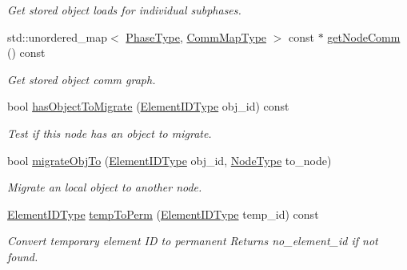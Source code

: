 \begin{DoxyCompactItemize}
\begin{DoxyCompactList}\small\item\em Get stored object loads for individual subphases. \end{DoxyCompactList}\item 
std\+::unordered\+\_\+map$<$ \hyperlink{namespacevt_a46ce6733d5cdbd735d561b7b4029f6d7}{Phase\+Type}, \hyperlink{namespacevt_1_1vrt_1_1collection_1_1balance_a10860c956804d644db54a16012352728}{Comm\+Map\+Type} $>$ const  $\ast$ \hyperlink{structvt_1_1vrt_1_1collection_1_1balance_1_1_node_stats_a236c9f6b9ba7446a35cbc1052949d558}{get\+Node\+Comm} () const
\begin{DoxyCompactList}\small\item\em Get stored object comm graph. \end{DoxyCompactList}\item 
bool \hyperlink{structvt_1_1vrt_1_1collection_1_1balance_1_1_node_stats_a06128ad9d9dff72bad160b015054b054}{has\+Object\+To\+Migrate} (\hyperlink{namespacevt_1_1vrt_1_1collection_1_1balance_a14c8d2c972f2913aa3f1636e5be0a120}{Element\+I\+D\+Type} obj\+\_\+id) const
\begin{DoxyCompactList}\small\item\em Test if this node has an object to migrate. \end{DoxyCompactList}\item 
bool \hyperlink{structvt_1_1vrt_1_1collection_1_1balance_1_1_node_stats_a4beddbda7ae149a3470eba3a2fe80db5}{migrate\+Obj\+To} (\hyperlink{namespacevt_1_1vrt_1_1collection_1_1balance_a14c8d2c972f2913aa3f1636e5be0a120}{Element\+I\+D\+Type} obj\+\_\+id, \hyperlink{namespacevt_a866da9d0efc19c0a1ce79e9e492f47e2}{Node\+Type} to\+\_\+node)
\begin{DoxyCompactList}\small\item\em Migrate an local object to another node. \end{DoxyCompactList}\item 
\hyperlink{namespacevt_1_1vrt_1_1collection_1_1balance_a14c8d2c972f2913aa3f1636e5be0a120}{Element\+I\+D\+Type} \hyperlink{structvt_1_1vrt_1_1collection_1_1balance_1_1_node_stats_a259d49b9aa4759b9d94be3e093fa2e6b}{temp\+To\+Perm} (\hyperlink{namespacevt_1_1vrt_1_1collection_1_1balance_a14c8d2c972f2913aa3f1636e5be0a120}{Element\+I\+D\+Type} temp\+\_\+id) const
\begin{DoxyCompactList}\small\item\em Convert temporary element ID to permanent Returns {\ttfamily no\+\_\+element\+\_\+id} if not found. \end{DoxyCompactList}\item 

\end{DoxyCompactItemize}
